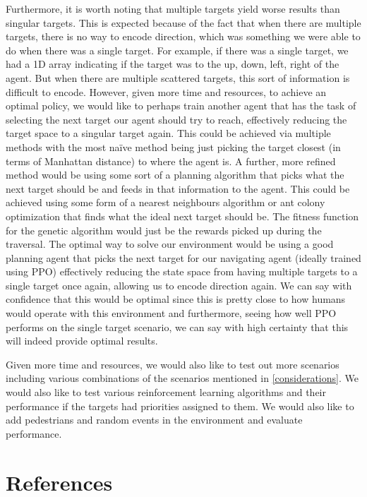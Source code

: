 \documentclass{article}
\begin{document}
Furthermore, it is worth noting that multiple targets yield worse results than singular targets. This is expected because of the fact that when there are multiple targets, there is no way to encode direction, which was something we were able to do when there was a single target. For example, if there was a single target, we had a 1D array indicating if the target was to the up, down, left, right of the agent. But when there are multiple scattered targets, this sort of information is difficult to encode. However, given more time and resources, to achieve an optimal policy, we would like to perhaps train another agent that has the task of selecting the next target our agent should try to reach, effectively reducing the target space to a singular target again. This could be achieved via multiple methods with the most na\"ive method being just picking the target closest (in terms of Manhattan distance) to where the agent is. A further, more refined method would be using some sort of a planning algorithm that picks what the next target should be and feeds in that information to the agent. This could be achieved using some form of a nearest neighbours algorithm or ant colony optimization that finds what the ideal next target should be. The fitness function for the genetic algorithm would just be the rewards picked up during the traversal. The optimal way to solve our environment would be using a good planning agent that picks the next target for our navigating agent (ideally trained using PPO) effectively reducing the state space from having multiple targets to a single target once again, allowing us to encode direction again. We can say with confidence that this would be optimal since this is pretty close to how humans would operate with this environment and furthermore, seeing how well PPO performs on the single target scenario, we can say with high certainty that this will indeed provide optimal results.

Given more time and resources, we would also like to test out more scenarios including various combinations of the scenarios mentioned in \ref{considerations}. We would also like to test various reinforcement learning algorithms and their performance if the targets had priorities assigned to them. We would also like to add pedestrians and random events in the environment and evaluate performance.

\section*{References}
\end{document}
